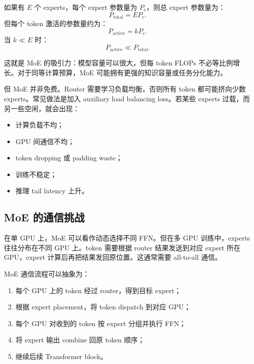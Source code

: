 如果有 $E$ 个 experts，每个 expert 参数量为 $P_e$，则总 expert 参数量为：
\[
P_{\mathrm{total}}=E P_e.
\]
但每个 token 激活的参数量约为：
\[
P_{\mathrm{active}}=kP_e.
\]
当 $k\ll E$ 时：
\[
P_{\mathrm{active}}\ll P_{\mathrm{total}}.
\]

这就是 MoE 的吸引力：模型容量可以很大，但每 token FLOPs 不必等比例增长。对于同等计算预算，MoE 可能拥有更强的知识容量或任务分化能力。

但 MoE 并非免费。Router 需要学习负载均衡，否则所有 token 都可能挤向少数 experts。常见做法是加入 auxiliary load balancing loss。若某些 experts 过载，而另一些空闲，就会出现：

\begin{itemize}
\item 计算负载不均；
\item GPU 间通信不均；
\item token dropping 或 padding waste；
\item 训练不稳定；
\item 推理 tail latency 上升。
\end{itemize}

\subsection{MoE 的通信挑战}
\label{subsec:moe-communication-challenge}

在单 GPU 上，MoE 可以看作动态选择不同 FFN。但在多 GPU 训练中，experts 往往分布在不同 GPU 上。token 需要根据 router 结果发送到对应 expert 所在 GPU，expert 计算后再把结果发回原位置。这通常需要 all-to-all 通信。

MoE 通信流程可以抽象为：

\begin{enumerate}
\item 每个 GPU 上的 token 经过 router，得到目标 expert；
\item 根据 expert placement，将 token dispatch 到对应 GPU；
\item 每个 GPU 对收到的 token 按 expert 分组并执行 FFN；
\item 将 expert 输出 combine 回原 token 顺序；
\item 继续后续 Transformer block。
\end{enumerate}

